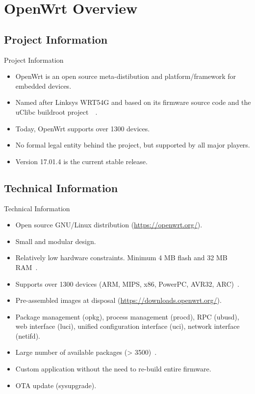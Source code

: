 \section{OpenWrt Overview}

\subsection{Project Information}
\begin{frame}{Project Information}
    \begin{itemize}[<+(1)->]
        \item OpenWrt is an open source meta-distibution and platform/framework for embedded devices.
        \item Named after Linksys WRT54G and based on its firmware source code and the uClibc buildroot project~\cite{wikipedia-linksys}~\cite{wifiplanet-story}.
        \item Today, OpenWrt supports over 1300 devices.
        \item No formal legal entity behind the project, but supported by all major players.
        \item Version 17.01.4 is the current stable release.
    \end{itemize}
\end{frame}

\subsection{Technical Information}
\begin{frame}{Technical Information}
    \begin{itemize}[<+(1)->]
        \item Open source GNU/Linux distribution (\url{https://openwrt.org/}).
        \item Small and modular design.
        \item Relatively low hardware constraints. Minimum 4 MB flash and 32 MB RAM~\cite{openwrt-requirements}.
        \item Supports over 1300 devices (ARM, MIPS, x86, PowerPC, AVR32, ARC)~\cite{openwrt-devices}.
        \item Pre-assembled images at disposal (\url{https://downloads.openwrt.org/}).
        \item Package management (opkg), process management (procd), RPC (ubusd), web interface (luci), unified configuration interface (uci), network interface (netifd).
        \item Large number of available packages (> 3500)~\cite{openwrt-packages}.
        \item Custom application without the need to re-build entire firmware.
        \item OTA update (sysupgrade).
    \end{itemize}
\end{frame}

